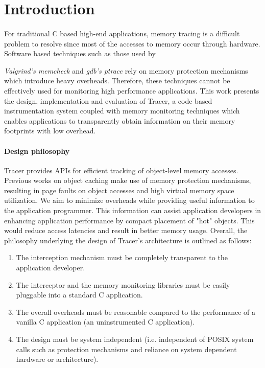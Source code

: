 \section{Introduction} 
\label{sec:intro}
\paragraph{}
For traditional C based high-end applications, memory tracing is a difficult problem to resolve since most of the accesses to memory occur through hardware. Software based techniques such as those used by {\emph{Valgrind's memcheck \cite{nethercote2007valgrind}} and {\emph{gdb's ptrace}} \cite{gdb} rely on memory protection mechanisms which introduce heavy overheads. Therefore, these techniques cannot be effectively used for monitoring high performance applications. This work presents the design, implementation and evaluation of Tracer, a code based instrumentation system coupled with memory monitoring techniques which enables applications to transparently obtain information on their memory footprints with low overhead. 

\paragraph{Design philosophy}
Tracer provides APIs for efficient tracking of object-level memory accesses. Previous works on object caching make use of memory protection mechanisms, resulting in page faults on object accesses and high virtual memory space utilization. We aim to minimize overheads while providing useful information to the application programmer. This information can assist application developers in enhancing application performance by compact placement of "hot" objects. This would reduce access latencies and result in better memory usage. Overall, the philosophy underlying the design of Tracer's architecture is outlined as follows:
\begin{enumerate}
\item The interception mechanism must be completely transparent to the application developer.
\item The interceptor and the memory monitoring libraries must be easily pluggable into a standard C application.
\item The overall overheads must be reasonable compared to the performance of a vanilla C application (an uninstrumented C application).
\item The design must be system independent (i.e. independent of POSIX system calls such as protection mechanisms and reliance on system dependent hardware or architecture).
\end{enumerate}

}
